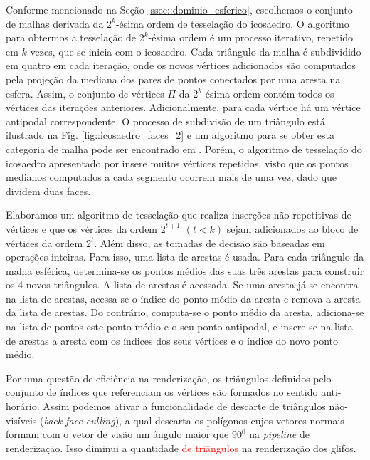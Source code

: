 
Conforme mencionado na Seção \ref{ssec::dominio_esferico}, escolhemos o conjunto de malhas derivada da $2^k$-ésima ordem de tesselação do icosaedro. O algoritmo para obtermos a tesselação de $2^k$-ésima ordem é um processo iterativo, repetido em $k$ vezes, que se inicia com o icosaedro. Cada triângulo da malha é subdividido em quatro em cada iteração, onde os novos vértices adicionados são computados pela projeção da mediana dos pares de pontos conectados por uma aresta na esfera. Assim, o conjunto de vértices $\Pi$ da $2^k$-ésima ordem contém todos os vértices das iterações anteriores. Adicionalmente, para cada vértice há um vértice antipodal correspondente. O processo de subdivisão de um triângulo está ilustrado na Fig. \ref{fig::icosaedro_faces_2} e um algoritmo para se obter esta categoria de malha pode ser encontrado em . Porém, o algoritmo de tesselação do icosaedro apresentado por  insere muitos vértices repetidos, visto que os pontos medianos computados a cada segmento ocorrem mais de uma vez, dado que dividem duas faces.


Elaboramos um algoritmo de tesselação que realiza inserções não-repetitivas de vértices e que os vértices da ordem $2^{t+1}$ $(t < k)$ sejam adicionados ao bloco de vértices da ordem $2^t$. Além disso, as tomadas de decisão são baseadas em operações inteiras. Para isso, uma lista de arestas é usada. Para cada triângulo da malha esférica, determina-se os pontos médios das suas três arestas para construir os 4 novos triângulos. A lista de arestas é acessada. Se uma aresta já se encontra na lista de arestas, acessa-se o índice do ponto médio da aresta e remova a aresta da lista de arestas. Do contrário, computa-se o ponto médio da aresta, adiciona-se na lista de pontos este ponto médio e o seu ponto antipodal, e insere-se na lista de arestas a aresta com os índices dos seus vértices e o índice do novo ponto médio.

Por uma questão de eficiência na renderização, os triângulos definidos pelo conjunto de índices que referenciam os vértices são formados no sentido anti-horário. Assim podemos ativar a funcionalidade de descarte de triângulos não-visíveis (\textit{back-face culling}), a qual descarta os polígonos cujos vetores normais formam com o vetor de visão um ângulo maior que 90$^0$ na \textit{pipeline} de renderização. Isso diminui a quantidade \textcolor{red}{de triângulos} na renderização dos glifos.

